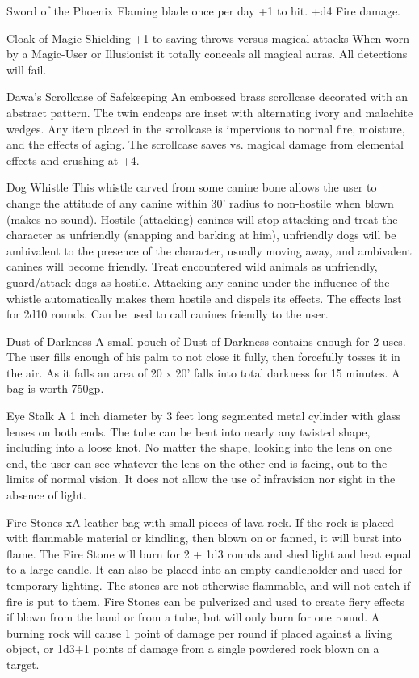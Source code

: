 Sword of the Phoenix
Flaming blade once per day +1 to hit.  +d4 Fire damage.

Cloak of Magic Shielding
+1 to saving throws versus magical attacks  When worn by a Magic-User or Illusionist it totally conceals all magical auras. All detections will fail.


Dawa’s Scrollcase of Safekeeping
An embossed brass scrollcase decorated with an abstract pattern.  The twin endcaps are inset with alternating ivory and malachite wedges. Any item placed in the scrollcase is impervious to normal fire, moisture, and the effects of aging. The scrollcase saves vs. magical damage from elemental effects and crushing at +4. 

Dog Whistle
This whistle carved from some canine bone allows the user to change the attitude of any canine within 30’ radius to non-hostile when blown (makes no sound). Hostile (attacking) canines will stop attacking and treat the character as unfriendly (snapping and barking at him), unfriendly dogs will be ambivalent to the presence of the character, usually moving away, and ambivalent canines will become friendly. Treat encountered wild animals as unfriendly, guard/attack dogs as hostile. Attacking any canine under the influence of the whistle automatically makes them hostile and dispels its effects. The effects last for 2d10 rounds. Can be used to call canines friendly to the user.


Dust of Darkness
A small pouch of Dust of Darkness contains enough for 2 uses. The user fills enough of his palm to not close it fully, then forcefully tosses it in the air. As it falls an area of 20 x 20' falls into total darkness for 15 minutes. A bag is worth 750gp.

Eye Stalk
A 1 inch diameter by 3 feet long segmented metal cylinder with glass lenses on both ends. The tube can be bent into nearly any twisted shape, including into a loose knot. No matter the shape, looking into the lens on one end, the user can see whatever the lens on the other end is facing, out to the limits of normal vision. It does not allow the use of infravision nor sight in the absence of light.

Fire Stones
xA leather bag with small pieces of lava rock. If the rock is placed with flammable material or kindling, then blown on or fanned, it will burst into flame. The Fire Stone will burn for 2 + 1d3 rounds and shed light and heat equal to a large candle. It can also be placed into an empty candleholder and used for temporary lighting. The stones are not otherwise flammable, and will not catch if fire is put to them. Fire Stones can be pulverized and used to create fiery effects if blown from the hand or from a tube, but will only burn for one round. A burning rock will cause 1 point of damage per round if placed against a living object, or 1d3+1 points of damage from a single powdered rock blown on a target.


